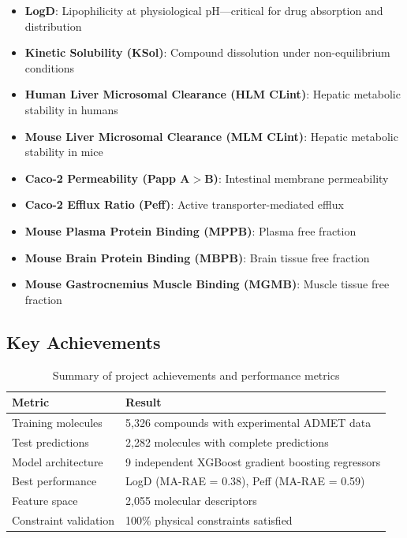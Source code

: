 \documentclass[11pt,a4paper]{article}
\newcommand{\marae}{MA-RAE}
\newcommand{\xgb}{XGBoost}
\newcommand{\admet}{ADMET}
\begin{document}
\begin{itemize}
    \item \textbf{LogD}: Lipophilicity at physiological pH---critical for drug absorption and distribution
    \item \textbf{Kinetic Solubility (KSol)}: Compound dissolution under non-equilibrium conditions
    \item \textbf{Human Liver Microsomal Clearance (HLM CLint)}: Hepatic metabolic stability in humans
    \item \textbf{Mouse Liver Microsomal Clearance (MLM CLint)}: Hepatic metabolic stability in mice
    \item \textbf{Caco-2 Permeability (Papp A$>$B)}: Intestinal membrane permeability
    \item \textbf{Caco-2 Efflux Ratio (Peff)}: Active transporter-mediated efflux
    \item \textbf{Mouse Plasma Protein Binding (MPPB)}: Plasma free fraction
    \item \textbf{Mouse Brain Protein Binding (MBPB)}: Brain tissue free fraction
    \item \textbf{Mouse Gastrocnemius Muscle Binding (MGMB)}: Muscle tissue free fraction
\end{itemize}

\subsection{Key Achievements}

\begin{table}[H]
\centering
\caption{Summary of project achievements and performance metrics}
\label{tab:achievements}
\begin{tabular}{p{}p{}}
\toprule
\textbf{Metric} & \textbf{Result} \\
\midrule
Training molecules & 5,326 compounds with experimental \admet{} data \\
Test predictions & 2,282 molecules with complete predictions \\
Model architecture & 9 independent \xgb{} gradient boosting regressors \\
Best performance & LogD (\marae{} = 0.38), Peff (\marae{} = 0.59) \\
Feature space & 2,055 molecular descriptors \\
Constraint validation & 100\% physical constraints satisfied \\
\bottomrule
\end{tabular}
\end{table}
\end{document}
